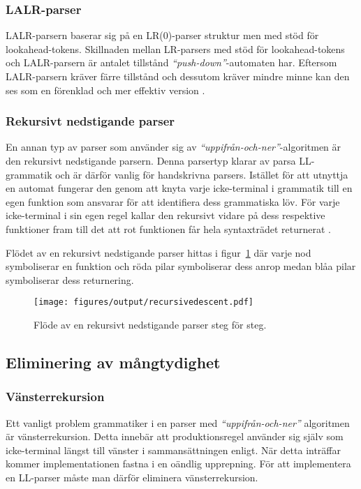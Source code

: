 \subsubsection{LALR-parser}

LALR-parsern baserar sig på en LR(0)-parser struktur men med stöd för
lookahead-tokens. Skillnaden mellan LR-parsers med stöd för lookahead-tokens
och LALR-parsern är antalet tillstånd \textit{``push-down''}-automaten har.
Eftersom LALR-parsern kräver färre tillstånd och dessutom kräver mindre minne
kan den ses som en förenklad och mer effektiv version \citep[s. 266]{aa06}.

\subsubsection{Rekursivt nedstigande parser}

En annan typ av parser som använder sig av
\textit{``uppifrån-och-ner''}-algoritmen är den rekursivt nedstigande parsern.
Denna parsertyp klarar av parsa LL-grammatik och är därför vanlig för
handskrivna parsers. Istället för att utnyttja en automat fungerar den genom
att knyta varje icke-terminal i grammatik till en egen funktion som ansvarar
för att identifiera dess grammatiska löv. För varje icke-terminal i sin egen
regel kallar den rekursivt vidare på dess respektive funktioner fram till det
att rot funktionen får hela syntaxträdet returnerat \citep[s. 24]{pt10}.

Flödet av en rekursivt nedstigande parser hittas i
figur~\ref{fig:recursivedescent} där varje nod symboliserar en funktion och
röda pilar symboliserar dess anrop medan blåa pilar symboliserar dess
returnering.

\begin{figure}[ht]
  \texttt{[image: figures/output/recursivedescent.pdf]}
  \caption{Flöde av en rekursivt nedstigande parser steg för steg.}
  \label{fig:recursivedescent}
\end{figure}

\subsection{Eliminering av mångtydighet}

\subsubsection{Vänsterrekursion}

Ett vanligt problem grammatiker i en parser med \textit{``uppifrån-och-ner''}
algoritmen är vänsterrekursion. Detta innebär att produktionsregel använder
sig själv som icke-terminal längst till vänster i sammansättningen enligt. När
detta inträffar kommer implementationen fastna i en oändlig upprepning. För
att implementera en LL-parser måste man därför eliminera vänsterrekursion.

